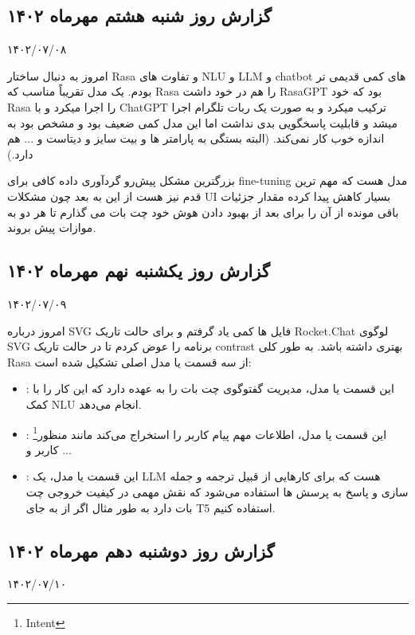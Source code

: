 \subsection{گزارش روز شنبه هشتم مهرماه ۱۴۰۲}

۱۴۰۲/۰۷/۰۸

امروز به دنبال ساختار Rasa و تفاوت های NLU و LLM و chatbot های کمی قدیمی تر بودم. یک مدل تقریباً مناسب که Rasa را هم در خود داشت RasaGPT بود که خود Rasa را اجرا میکرد و با ChatGPT ترکیب میکرد و به صورت یک ربات تلگرام اجرا میشد و قابلیت پاسخگویی بدی نداشت اما این مدل کمی ضعیف بود و مشخص بود به اندازه  خوب کار نمی‌کند. (البته بستگی به پارامتر ها و بیت سایز و دیتاست و ... هم دارد.)

بزرگترین مشکل پیش‌رو گردآوری داده کافی برای fine-tuning مدل هست که مهم ترین قدم نیز هست 
از این به بعد چون مشکلات UI بسیار کاهش پیدا کرده مقدار جزئیات باقی مونده از آن را برای بعد از بهبود دادن هوش خود چت بات می گذارم تا هر دو به موازات پیش بروند.


\subsection{گزارش روز یکشنبه نهم مهرماه ۱۴۰۲}

۱۴۰۲/۰۷/۰۹

امروز درباره SVG فایل ها کمی یاد گرفتم و برای حالت تاریک Rocket.Chat لوگوی SVG برنامه را عوض کردم تا در حالت تاریک contrast بهتری داشته باشد.
به طور کلی Rasa از سه قسمت یا مدل اصلی تشکیل شده است:

\begin{itemize}
    \item {} : این قسمت یا مدل، مدیریت گفتوگوی چت بات را به عهده دارد که این کار را با کمک NLU انجام می‌دهد.
    \item {} : این قسمت یا مدل، اطلاعات مهم پیام کاربر را استخراج می‌کند مانند منظور\footnote{Intent} کاربر و ...
    \item {} : این قسمت یا مدل، یک LLM هست که برای کارهایی از قبیل ترجمه و جمله سازی و پاسخ به پرسش ها استفاده می‌شود که نقش مهمی در کیفیت خروجی چت بات دارد به طور مثال اگر از  به جای T5 استفاده کنیم.
\end{itemize}


\subsection{گزارش روز دوشنبه دهم مهرماه ۱۴۰۲}

۱۴۰۲/۰۷/۱۰

